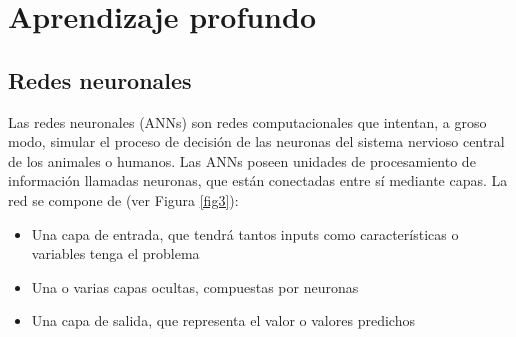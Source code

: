\section{Aprendizaje profundo}

\subsection{Redes neuronales}
Las redes neuronales (ANNs) \cite{24, 25} son redes computacionales que intentan, a groso modo, simular el proceso de decisión de las neuronas del sistema nervioso central de los animales o humanos. Las ANNs poseen unidades de procesamiento de información llamadas neuronas, que están conectadas entre sí mediante capas. La red se compone de (ver Figura \ref{fig3}):
\begin{itemize}
	\item Una capa de entrada, que tendrá tantos inputs como características o variables tenga el problema
	\item Una o varias capas ocultas, compuestas por neuronas
	\item Una capa de salida, que representa el valor o valores predichos
\end{itemize} 


